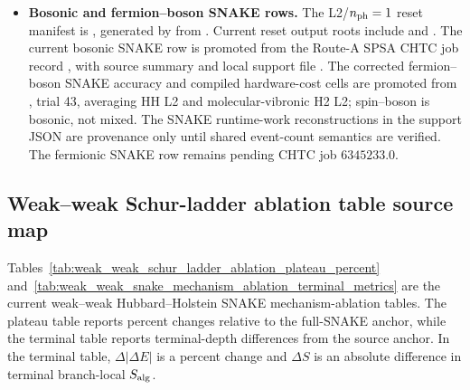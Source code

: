 \documentclass[
  reprint,
  amsmath,
  amssymb,
  aps,
  pra,
  nofootinbib,
  superscriptaddress,
  floatfix
]{revtex4-2}
\begin{document}
\begin{itemize}
\item \textbf{Bosonic and fermion--boson SNAKE rows.} The L2/$n_{\rm ph}=1$ reset manifest is , generated by  from . Current reset output roots include  and . The current bosonic SNAKE row is promoted from the Route-A SPSA CHTC job record , with source summary  and local support file . The corrected fermion--boson SNAKE accuracy and compiled hardware-cost cells are promoted from , trial 43, averaging HH L2 and molecular-vibronic H2 L2; spin--boson is bosonic, not mixed. The SNAKE runtime-work reconstructions in the support JSON are provenance only until shared event-count semantics are verified. The fermionic SNAKE row remains pending CHTC job $6345233.0$.
\end{itemize}

\subsection{Weak--weak Schur-ladder ablation table source map}
\label{app:table_ii_source_map}

Tables~\ref{tab:weak_weak_schur_ladder_ablation_plateau_percent} and~\ref{tab:weak_weak_snake_mechanism_ablation_terminal_metrics} are the current weak--weak Hubbard--Holstein SNAKE mechanism-ablation tables. The plateau table reports percent changes relative to the full-SNAKE anchor, while the terminal table reports terminal-depth differences from the source anchor. In the terminal table, \(\Delta|\Delta E|\) is a percent change and \(\Delta S\) is an absolute difference in terminal branch-local \(S_{\rm alg}\).
\end{document}
